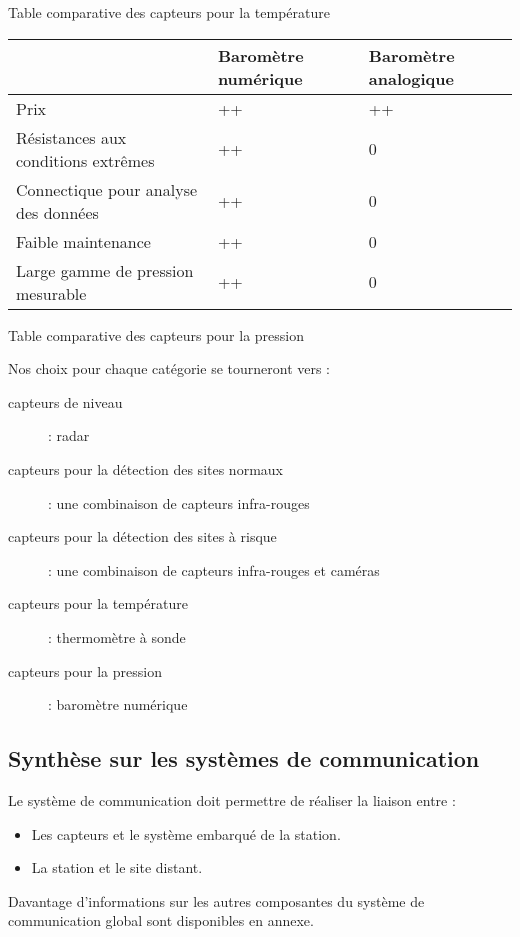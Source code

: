 \documentclass{article}
\begin{document}
Table comparative des capteurs pour la température




\begin{flushleft}
\tablehead{}
\begin{supertabular}{|m{5.303cm}|m{5.303cm}|m{5.303cm}|}
\hline
~
 &
Baromètre numérique &
Baromètre analogique\\\hline
Prix &
++ &
++\\\hline
Résistances aux conditions extrêmes &
++ &
0\\\hline
Connectique pour analyse des données &
++ &
0\\\hline
Faible maintenance &
++ &
0\\\hline
Large gamme de pression mesurable &
++ &
0\\\hline
\end{supertabular}
\end{flushleft}



Table comparative des capteurs pour la pression

Nos choix pour chaque catégorie se tourneront vers :

\begin{description}
\item[capteurs de niveau] : radar
\item[capteurs pour la détection des sites normaux] : une combinaison de
capteurs infra-rouges 
\item[capteurs pour la détection des sites à risque] : une combinaison de
capteurs infra-rouges et caméras
\item[capteurs pour la température] : thermomètre à sonde
\item[capteurs pour la pression] : baromètre numérique
\end{description}

\subsection{Synthèse sur les systèmes de communication}
Le système de communication doit permettre de réaliser la liaison entre
:

\begin{itemize}
\item Les capteurs et le système embarqué de la station.
\item La station et le site distant.
\end{itemize}
Davantage d’informations sur les autres composantes du système de
communication global sont disponibles en annexe.
\end{document}
